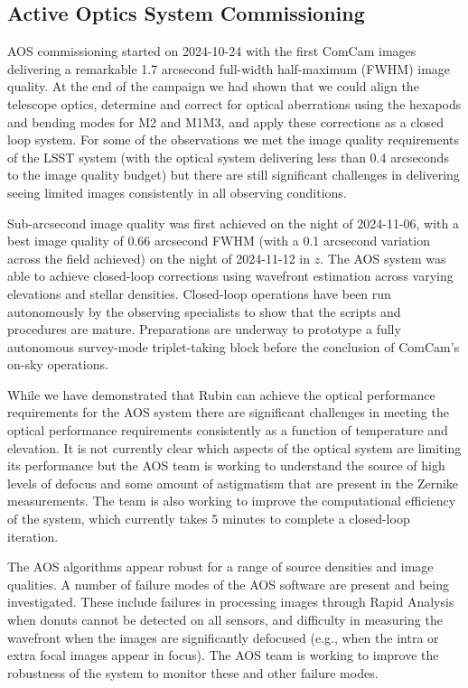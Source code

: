 \subsection{Active Optics System Commissioning}
\label{sec:aos_commissioning}

AOS commissioning started on 2024-10-24 with the first ComCam images delivering a remarkable 1.7 arcsecond
full-width half-maximum (FWHM) image quality. At the end of the campaign we had shown that we could align the
telescope optics, determine and correct for optical aberrations using the hexapods and bending modes for M2
and M1M3, and apply these corrections as a closed loop system. For some of the observations we met the image
quality requirements of the LSST system (\ie with the optical system delivering less than 0.4 arcseconds to
the image quality budget) but there are still significant challenges in delivering seeing limited images
consistently in all observing conditions.

Sub-arcsecond image quality was first achieved on the night of 2024-11-06, with a best image quality of 0.66 arcsecond FWHM (with a 0.1 arcsecond variation across the field achieved) on the night of 2024-11-12 in $z$. The AOS system was able to achieve closed-loop corrections using wavefront estimation across varying elevations and stellar densities. Closed-loop operations have been run autonomously by the observing specialists to show that the scripts and procedures are mature. Preparations are underway to prototype a fully autonomous survey-mode triplet-taking block before the conclusion of ComCam's on-sky operations.

While we have demonstrated that Rubin can achieve the optical performance requirements for the AOS system there are significant challenges in meeting the optical performance requirements consistently as a function of temperature and elevation. It is not currently clear which aspects of the optical system are limiting its performance but the AOS team is working to understand the source of high levels of defocus and some amount of astigmatism that are present in the Zernike measurements. The team is also working to improve the computational efficiency of the system, which currently takes 5 minutes to complete a closed-loop iteration. 

The AOS algorithms appear robust for a range of source densities and image qualities. A number of failure modes of the AOS software are present and being investigated. These include failures in processing images through Rapid Analysis when donuts cannot be detected on all sensors, and difficulty in measuring the wavefront when the images are significantly defocused (e.g., when the intra or extra focal images appear in focus). The AOS team is working to improve the robustness of the system to monitor these and other failure modes.

